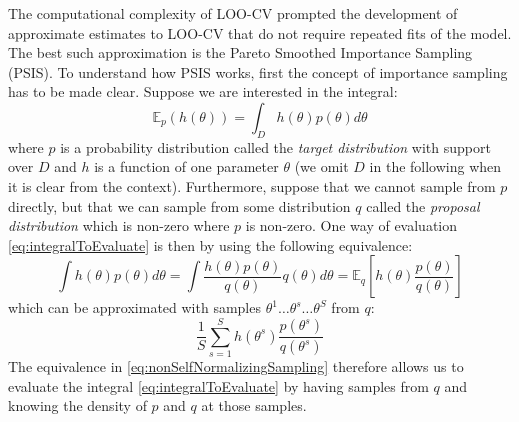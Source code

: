\documentclass[a4paper,12pt,twoside]{article}
\begin{document}
The computational complexity of LOO-CV prompted the development of approximate estimates to LOO-CV that do not require repeated fits of the model. The best such approximation is the Pareto Smoothed Importance Sampling (PSIS). To understand how PSIS works, first the concept of importance sampling has to be made clear. Suppose we are interested in the integral:
\begin{equation}\label{eq:integralToEvaluate}
\mathbb{E}_p(h(\theta)) = \int_D h(\theta)p(\theta) d \theta
\end{equation}
where $p$ is a probability distribution called the \textit{target distribution} with support over $D$ and $h$ is a function of one parameter $\theta$ (we omit $D$ in the following when it is clear from the context). Furthermore, suppose that we cannot sample from $p$ directly, but that we can sample from some distribution $q$ called the \textit{proposal distribution} which is non-zero where $p$ is non-zero. One way of evaluation \ref{eq:integralToEvaluate} is then by using the following equivalence:
\begin{equation}\label{eq:nonSelfNormalizingSampling}
\int h(\theta)p(\theta) d \theta = \int \frac{h(\theta) p(\theta)}{q(\theta)} q(\theta) d\theta =
\mathbb{E}_q \left[ h(\theta) \frac{p(\theta)}{q(\theta)} \right]
\end{equation}
which can be approximated with samples $\theta^1 \dots \theta^s \dots \theta^S$ from $q$:
\begin{equation}
\frac{1}{S}\sum_{s=1}^S h(\theta^s) \frac{p(\theta^s)}{q(\theta^s)}
\end{equation}
The equivalence in \ref{eq:nonSelfNormalizingSampling} therefore allows us to evaluate the integral \ref{eq:integralToEvaluate} by having samples from $q$ and knowing the density of $p$ and $q$ at those samples. 
\end{document}
